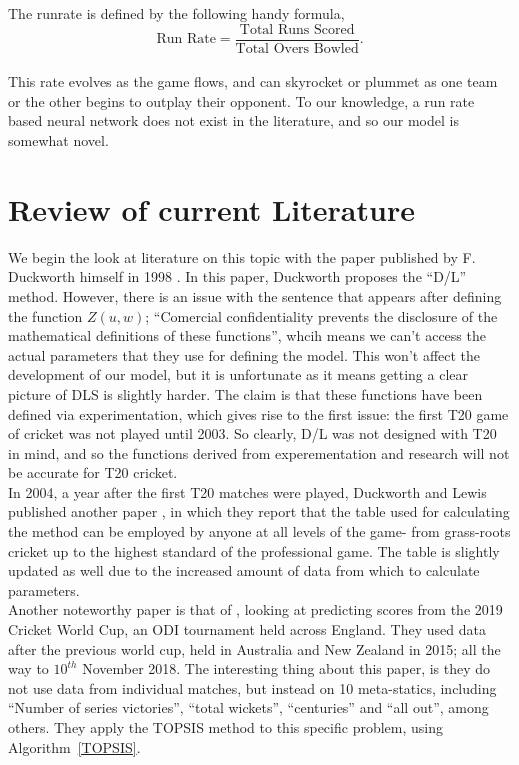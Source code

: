 The runrate is defined by the following handy formula, \\

\[
    \text{Run Rate}  = \frac{\text{Total Runs Scored}}{\text{Total Overs Bowled}}.
\]\\

This rate evolves as the game flows, and can skyrocket or plummet as one team or the other begins to outplay their opponent. To our knowledge, a run rate 
based neural network does not exist in the literature, and so our model is somewhat novel.

\section{Review of current Literature}
We begin the look at literature on this topic with the paper published by F. Duckworth himself in 1998 \cite{duckworth}. In this paper, 
Duckworth proposes the ``D/L'' method. However, there is an issue with the sentence that appears after defining the function $Z(u,w)$;
``Comercial confidentiality prevents the disclosure of the mathematical definitions of these functions'', whcih means we can't access the actual parameters 
that they use for defining the model. This won't affect the development of our model, but it is unfortunate as it means getting a clear picture of DLS is slightly harder.
The claim is that these functions have been defined via experimentation, which gives rise to the first issue: the first T20 game of cricket was not played until 2003. 
So clearly, D/L was not designed with T20 in mind, and so the functions derived from experementation and research will not be accurate for T20 cricket. \\

In 2004, a year after the first T20 matches were played, Duckworth and Lewis published another paper \cite{duckworth2}, in which they report
that the table used for calculating the method can be employed by anyone at all levels of the game- from grass-roots cricket up to the highest standard of 
the professional game. The table is slightly updated as well due to the increased amount of data from which to calculate parameters. \\

Another noteworthy paper is that of \cite{saqlain}, looking at predicting scores from the 2019 Cricket World Cup, an ODI
tournament held across England. They used data after the previous world cup, held in Australia and New Zealand in 2015; all the way to $10^{th}$ November
2018. The interesting thing about this paper, is they do not use data from individual matches, but instead on 10 meta-statics, including 
``Number of series victories'', ``total wickets'', ``centuries'' and ``all out'', among others. They apply the TOPSIS method to this specific problem, using Algorithm~\ref{TOPSIS}. \\

